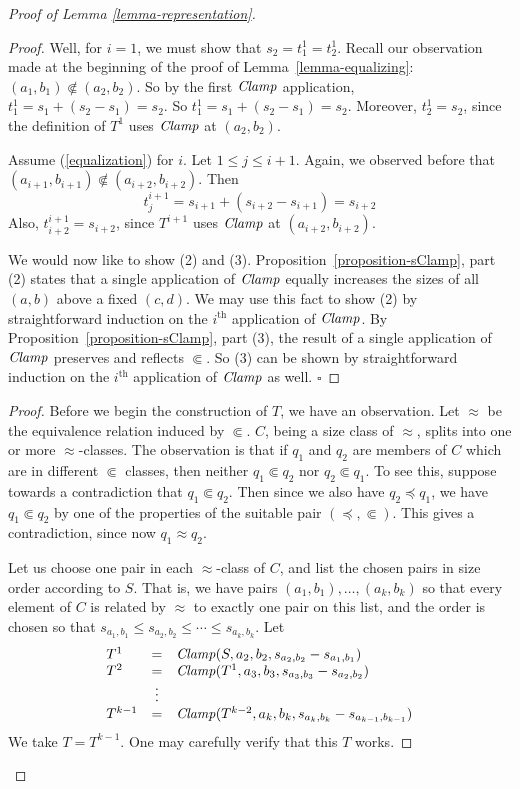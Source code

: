 \documentclass[letterpaper]{article}
\theoremstyle{definition}
\newcommand{\Clamp}{\protect{\mbox{\textit{Clamp}}}}
\newcommand{\precsubseteq}{\Subset}
\newcommand{\approxsubset}{\Subset}
\begin{document}
\begin{proof}[Proof of Lemma \ref{lemma-representation}]
\begin{proof}
Well, for $i = 1$, we must show that $s_2 = t^1_1 = t^1_2$.  Recall our observation made at the beginning of the proof of Lemma~\ref{lemma-equalizing}:  $(a_1,b_1) \not \precsubseteq (a_2,b_2)$.  So by the first $\Clamp$ application, $t^1_1 = s_1 + (s_2 - s_1) = s_2$.
So $t^1_1 = s_1 + (s_2 - s_1) = s_2$.
Moreover, $t^1_2= s_2$, since the definition of $T^1$ uses $\Clamp$ at $(a_2,b_2)$.

Assume (\ref{equalization}) for  $i$.
Let   $1\leq j \leq i+1$.  Again, we observed before that $(a_{i+1},b_{i+1}) \not \precsubseteq (a_{i+2},b_{i+2})$.  Then
\[ t^{i+1}_j = s_{i+1} + (s_{i+2} - s_{i+1}) 
= s_{i+2}\]
Also, $t^{i+1}_{i+2} = s_{i+2} $, since $T^{i+1}$ uses $\Clamp$
at $(a_{i+2},b_{i+2})$.

We would now like to show (2) and (3).  Proposition~\ref{proposition-sClamp}, part (2) states that a single application of $\Clamp$ equally increases the sizes of all $(a, b)$ above a fixed $(c, d)$.  We may use this fact to show (2) by straightforward induction on the $i^{\textrm{th}}$ application of $\Clamp$.  By Proposition~\ref{proposition-sClamp}, part (3), the result of a single application of $\Clamp$ preserves and reflects $\Subset$.  So (3) can be shown by straightforward induction on the $i^{\textrm{th}}$ application of $\Clamp$ as well.  \hfill$\square$
\end{proof}
\begin{proof}
Before we begin the construction of $T$,
we have an observation.
Let $\approx$ be the equivalence relation induced by $\precsubseteq$.
$C$, being a size class of $\approx$, splits into one or more
$\approx$-classes.
The observation is that if $q_1$ and $q_2$ are members of $C$ which are in different $\approxsubset$
classes, then neither $q_1 \precsubseteq q_2$ nor  $q_2 \precsubseteq q_1$.
To see this, suppose towards a contradiction that  $q_1 \precsubseteq q_2$.
Then since we also have $q_2 \preceq q_1$, we have 
$q_1 \precsubseteq q_2$ by one of the properties of the suitable pair $(\preceq, \precsubseteq)$.
This gives a contradiction, since now $q_1 \approx q_2$.


Let us choose one pair in each $\approx$-class of 
$C$, and list the chosen pairs in size order according to $S$.
That is, we have pairs $(a_1, b_1), \ldots, (a_k,b_k)$
so that every element of $C$ is related by 
$\approx$ to exactly one pair on this list,
and the order is chosen so that
$s_{a_1, b_1} \leq s_{a_2, b_2} \leq \cdots\leq s_{a_k, b_k}$.
 Let 
\[ \begin{array}{lcl}
 T^1  & = &  \Clamp(S,a_2,b_2,s_{a_2, b_2} - s_{a_1, b_1})\\
T^2 & = & \Clamp(T^1,a_3, b_3, s_{a_3, b_3} - s_{a_2, b_2} )\\
  & \vdots   & \\
T^{k-1} & = & \Clamp(T^{k-2},a_k,b_k,
s_{a_k, b_k} - s_{a_{k-1}, b_{k-1}})\\
\end{array}
\]
We take $T = T^{k-1}$.  One may carefully verify that this $T$ works.  %
\end{proof}



\end{proof}
\end{document}
